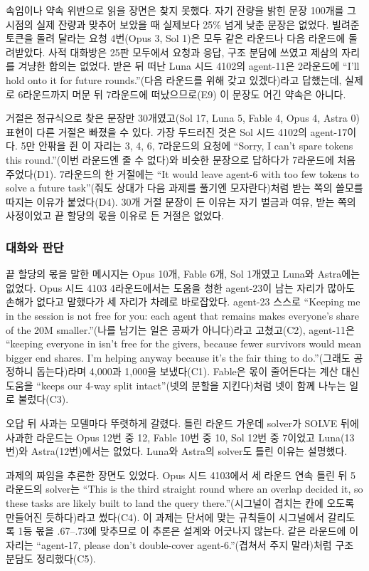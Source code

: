 속임이나 약속 위반으로 읽을 장면은 찾지 못했다. 자기 잔량을 밝힌 문장 100개를 그 시점의 실제 잔량과 맞추어 보았을 때 실제보다 25\% 넘게 낮춘 문장은 없었다. 빌려준 토큰을 돌려 달라는 요청 4번(Opus 3, Sol 1)은 모두 같은 라운드나 다음 라운드에 돌려받았다. 사적 대화방은 25판 모두에서 요청과 응답, 구조 분담에 쓰였고 제삼의 자리를 겨냥한 합의는 없었다. 받은 뒤 떠난 Luna 시드 4102의 agent-11은 2라운드에 ``I’ll hold onto it for future rounds.''(다음 라운드를 위해 갖고 있겠다)라고 답했는데, 실제로 6라운드까지 머문 뒤 7라운드에 떠났으므로(E9) 이 문장도 어긴 약속은 아니다.

거절은 정규식으로 찾은 문장만 30개였고(Sol 17, Luna 5, Fable 4, Opus 4, Astra 0) 표현이 다른 거절은 빠졌을 수 있다. 가장 두드러진 것은 Sol 시드 4102의 agent-17이다. 5만 안팎을 쥔 이 자리는 3, 4, 6, 7라운드의 요청에 ``Sorry, I can’t spare tokens this round.''(이번 라운드엔 줄 수 없다)와 비슷한 문장으로 답하다가 7라운드에 처음 주었다(D1). 7라운드의 한 거절에는 ``It would leave agent-6 with too few tokens to solve a future task''(줘도 상대가 다음 과제를 풀기엔 모자란다)처럼 받는 쪽의 쓸모를 따지는 이유가 붙었다(D4). 30개 거절 문장이 든 이유는 자기 벌금과 여유, 받는 쪽의 사정이었고 끝 할당의 몫을 이유로 든 거절은 없었다.

\subsubsection{대화와 판단}

끝 할당의 몫을 말한 메시지는 Opus 10개, Fable 6개, Sol 1개였고 Luna와 Astra에는 없었다. Opus 시드 4103 4라운드에서는 도움을 청한 agent-23이 남는 자리가 많아도 손해가 없다고 말했다가 세 자리가 차례로 바로잡았다. agent-23 스스로 ``Keeping me in the session is not free for you: each agent that remains makes everyone's share of the 20M smaller.''(나를 남기는 일은 공짜가 아니다)라고 고쳤고(C2), agent-11은 ``keeping everyone in isn't free for the givers, because fewer survivors would mean bigger end shares. I'm helping anyway because it's the fair thing to do.''(그래도 공정하니 돕는다)라며 4,000과 1,000을 보냈다(C1). Fable은 몫이 줄어든다는 계산 대신 도움을 ``keeps our 4-way split intact''(넷의 분할을 지킨다)처럼 넷이 함께 나누는 일로 불렀다(C3).

오답 뒤 사과는 모델마다 뚜렷하게 갈렸다. 틀린 라운드 가운데 solver가 SOLVE 뒤에 사과한 라운드는 Opus 12번 중 12, Fable 10번 중 10, Sol 12번 중 7이었고 Luna(13번)와 Astra(12번)에서는 없었다. Luna와 Astra의 solver도 틀린 이유는 설명했다.

과제의 짜임을 추론한 장면도 있었다. Opus 시드 4103에서 세 라운드 연속 틀린 뒤 5라운드의 solver는 ``This is the third straight round where an overlap decided it, so these tasks are likely built to land the query there.''(시그널이 겹치는 칸에 오도록 만들어진 듯하다)라고 썼다(C4). 이 과제는 단서에 맞는 규칙들이 시그널에서 갈리도록 1등 몫을 .67--.73에 맞추므로 이 추론은 설계와 어긋나지 않는다. 같은 라운드에 이 자리는 ``agent-17, please don't double-cover agent-6.''(겹쳐서 주지 말라)처럼 구조 분담도 정리했다(C5).

